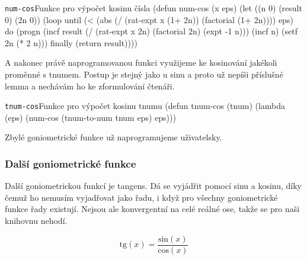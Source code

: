 \begin{lispcode}{\texttt{num-cos}}{Funkce pro výpočet kosinu čísla}
(\textcolor{funkcionalni}{defun} \textcolor{pojmenovan}{num-cos} (x eps)
  (\textcolor{vedlejsi}{let} ((n 0) (result 0) (2n 0))
    (\textcolor{funkcionalni}{loop} 
      \textcolor{obarvi}{until} (\textcolor{matematicke}{<} (\textcolor{matematicke}{abs} (\textcolor{matematicke}{/} (\textcolor{moje}{rat-expt} x (\textcolor{matematicke}{1+} 2n))
                        (\textcolor{moje}{factorial} (\textcolor{matematicke}{1+} 2n))))
                eps)
      \textcolor{obarvi}{do} (\textcolor{funkcionalni}{progn} 
          (\textcolor{vedlejsi}{incf} result
            (\textcolor{matematicke}{/} (\textcolor{moje}{rat-expt} x 2n)
               (\textcolor{moje}{factorial} 2n)
               (\textcolor{matematicke}{expt} -1 n)))
          (\textcolor{vedlejsi}{incf} n)
          (\textcolor{vedlejsi}{setf} 2n (\textcolor{matematicke}{*} 2 n)))
      \textcolor{obarvi}{finally} (\textcolor{funkcionalni}{return} result))))
\end{lispcode}

A nakonec právě naprogramovanou funkci využijeme ke kosinování jakékoli proměnné s tnumem. Postup je stejný jako u sinu a proto už nepíši příslušné lemma a nechávám ho ke zformulování čtenáři.

\begin{lispcode}{\texttt{tnum-cos}}{Funkce pro výpočet kosinu tnumu}
(\textcolor{funkcionalni}{defun} \textcolor{pojmenovan}{tnum-cos} (tnum)
  (\textcolor{funkcionalni}{lambda} (eps)
    (\textcolor{moje}{num-cos} (\textcolor{moje}{tnum-to-num} tnum eps) eps)))
\end{lispcode}

Zbylé goniometrické funkce už naprogramujeme uživatelsky.

\subsubsection{Další goniometrické funkce}
Další goniometrickou funkcí je tangens. Dá se vyjádřit pomocí sinu a kosinu, díky čemuž ho nemusím vyjadřovat jako řadu, i když pro všechny goniometrické funkce řady existují. Nejsou ale konvergentní na celé reálné ose, takže se pro naši knihovnu nehodí.
\begin{fact}
\begin{equation}
\mathrm{tg}(x)=\frac{\mathrm{sin}(x)}{\mathrm{cos}(x)}
\end{equation}
\end{fact}

